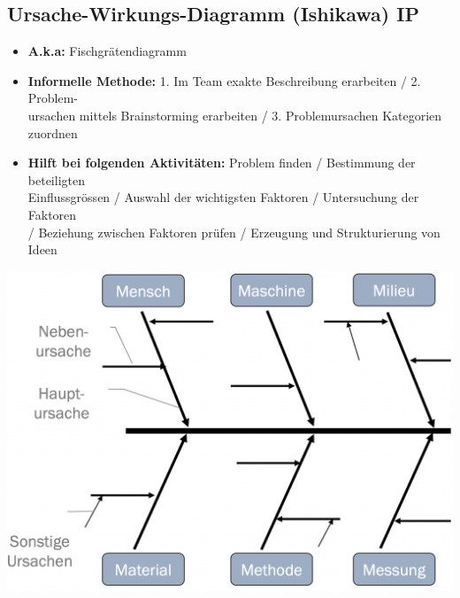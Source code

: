\subsection{Ursache-Wirkungs-Diagramm (Ishikawa) \hfill IP}
    \begin{scriptsize}
        \begin{itemize}
            \item \textbf{A.k.a:} Fischgrätendiagramm
            \item \textbf{Informelle Methode:} 1. Im Team exakte Beschreibung erarbeiten / 2. Problem-\\ursachen mittels Brainstorming erarbeiten / 3. Problemursachen Kategorien \\zuordnen
            \item \textbf{Hilft bei folgenden Aktivitäten:} Problem finden / Bestimmung der beteiligten \\Einflussgrössen / Auswahl der wichtigsten Faktoren / Untersuchung der Faktoren \\/ Beziehung zwischen Faktoren prüfen / Erzeugung und Strukturierung von Ideen
        \end{itemize}
    \end{scriptsize}
        \includegraphics[width = 0.5\linewidth]{src/images/MAEIP_Fischgraeten}